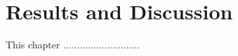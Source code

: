 
\chapter{Results and Discussion} 
\label{chapter:simu}



\ifpdf
    \graphicspath{{6_Resultsanddiscussion/figures/PNG/}{6_Resultsanddiscussion/figures/PDF/}{6_Resultsanddiscussion/figures/}}
\else
    \graphicspath{{6_Resultsanddiscussion/figures/EPS/}{6_Resultsanddiscussion/figures/}}
\fi



This chapter ............................


